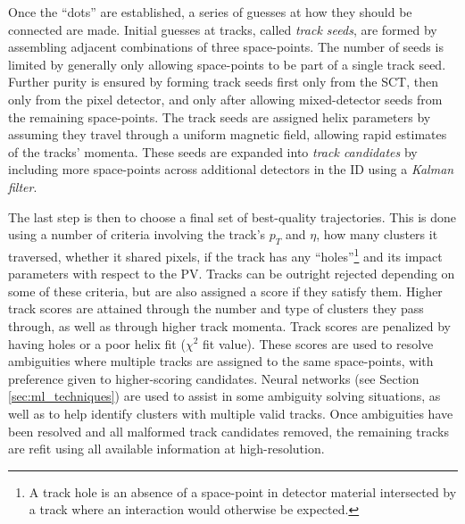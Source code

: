             Once the ``dots'' are established, a series of guesses at how they should be connected are made.
            Initial guesses at tracks, called \textit{track seeds}, are formed by assembling adjacent combinations of three space-points.
            The number of seeds is limited by generally only allowing space-points to be part of a single track seed.
            Further purity is ensured by forming track seeds first only from the SCT, then only from the pixel detector,
                and only after allowing mixed-detector seeds from the remaining space-points.
            The track seeds are assigned helix parameters by assuming they travel through a uniform magnetic field,
                allowing rapid estimates of the tracks' momenta.
            These seeds are expanded into \textit{track candidates}
                by including more space-points across additional detectors in the ID using a \textit{Kalman filter}.

            The last step is then to choose a final set of best-quality trajectories.
            This is done using a number of criteria involving
                the track's $p_T$ and $\eta$,
                how many clusters it traversed, 
                whether it shared pixels,
                if the track has any ``holes''\footnote{
                    A track hole is an absence of a space-point in detector material intersected by a track
                    where an interaction would otherwise be expected.}
                and its impact parameters with respect to the PV\cite{atlas_track_reco_performance}.
            Tracks can be outright rejected depending on some of these criteria,
                but are also assigned a score if they satisfy them.
            Higher track scores are attained through the number and type of clusters they pass through,
                as well as through higher track momenta.
            Track scores are penalized by having holes or a poor helix fit ($\chi^2$ fit value).
            These scores are used to resolve ambiguities where multiple tracks are assigned to the same space-points,
                with preference given to higher-scoring candidates.
            Neural networks (see Section \ref{sec:ml_techniques})
                are used to assist in some ambiguity solving situations,
                as well as to help identify clusters with multiple valid tracks.
            Once ambiguities have been resolved and all malformed track candidates removed,
                the remaining tracks are refit using all available information at high-resolution\cite{atlas_track_reco_performance}.

